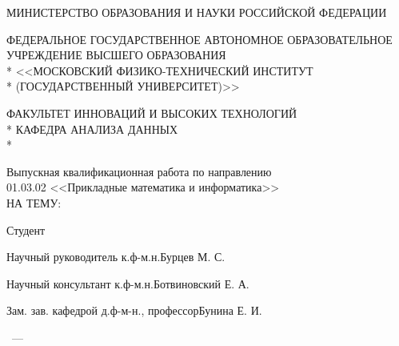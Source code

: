 \thispagestyle{empty}%
\begin{center}%

МИНИСТЕРСТВО ОБРАЗОВАНИЯ И НАУКИ РОССИЙСКОЙ ФЕДЕРАЦИИ \\
\bigskip

\MakeUppercase{Федеральное государственное автономное образовательное учреждение высшего образования} \\*
<<МОСКОВСКИЙ ФИЗИКО-ТЕХНИЧЕСКИЙ ИНСТИТУТ \\*
(ГОСУДАРСТВЕННЫЙ УНИВЕРСИТЕТ)>> \\
\bigskip

ФАКУЛЬТЕТ ИННОВАЦИЙ И ВЫСОКИХ ТЕХНОЛОГИЙ \\*
КАФЕДРА АНАЛИЗА ДАННЫХ \\*
\hrulefill
\end{center}%

\begin{center}%
\vspace{0pt plus3fill} %
\large
Выпускная квалификационная работа по направлению \\
01.03.02 <<Прикладные математика и информатика>> \\
НА ТЕМУ:
\vspace{0pt plus2fill}

\textbf {\large \thesisTitle}
\end{center}%
%
\vspace{0pt plus4fill} %
\noindent
Студент\hrulefill\thesisAuthorShort
\medskip

\noindent
Научный руководитель к.ф-м.н.\hrulefill{}Бурцев М. С.%
\medskip

\noindent
Научный консультант к.ф-м.н.\hrulefill{}Ботвиновский Е. А.%
\medskip

\noindent
Зам. зав. кафедрой д.ф-м-н., профессор\hrulefill{}Бунина Е. И.%
%
\vspace{0pt plus1.5fill} %
\begin{center}%
{\thesisCity~--- \thesisYear}
\end{center}%
\newpage
